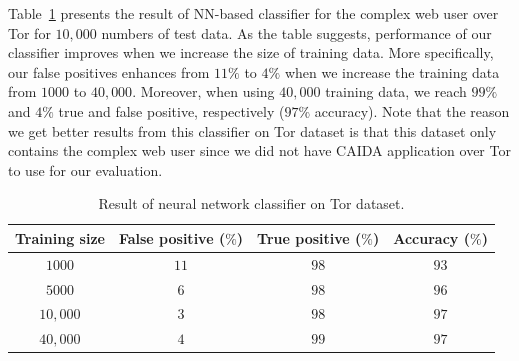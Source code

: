 Table~\ref{tab:nn_tor} presents the result of NN-based classifier for the complex web user over Tor for $10,000$ numbers of test data. As the table suggests, performance of our classifier improves when we increase the size of training data. More specifically, our false positives enhances from $11\%$ to $4\%$ when we increase the training data from $1000$ to $40,000$. Moreover, when using $40,000$ training data, we reach $99\%$ and $4\%$ true and false positive, respectively ($97\%$ accuracy). Note that the reason we get better results from this classifier on Tor dataset is that this dataset only contains the complex web user since we did not have CAIDA application over Tor to use for our evaluation.

\begin{table}
\center \caption{Result of neural network classifier on Tor dataset.}\label{tab:nn_tor}
\begin{tabular}{|c|c|c|c|}
\hline
 Training size& False positive ($\%$) &True positive ($\%$)&Accuracy ($\%$)\\
      \hline
	$1000$&$11$ &$98 $  & $93$\\
	$5000$&$6$& $98$  & $96$\\
	$10,000$&$3$& $98$  &$ 97$\\
	$40,000$&$4$& $99$   & $97$\\
\hline
\end{tabular}
\end{table}


